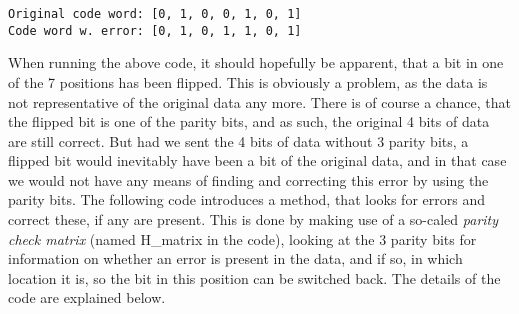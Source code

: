 \documentclass[11pt]{article}
\begin{document}
    \begin{Verbatim}[commandchars=\\\{\}]
Original code word: [0, 1, 0, 0, 1, 0, 1]
Code word w. error: [0, 1, 0, 1, 1, 0, 1]

    \end{Verbatim}

    When running the above code, it should hopefully be apparent, that a bit
in one of the 7 positions has been flipped. This is obviously a problem,
as the data is not representative of the original data any more. There
is of course a chance, that the flipped bit is one of the parity bits,
and as such, the original 4 bits of data are still correct. But had we
sent the 4 bits of data without 3 parity bits, a flipped bit would
inevitably have been a bit of the original data, and in that case we
would not have any means of finding and correcting this error by using
the parity bits. The following code introduces a method, that looks for
errors and correct these, if any are present. This is done by making use
of a so-caled \emph{parity check matrix} (named H\_matrix in the code),
looking at the 3 parity bits for information on whether an error is
present in the data, and if so, in which location it is, so the bit in
this position can be switched back. The details of the code are
explained below.
\end{document}
